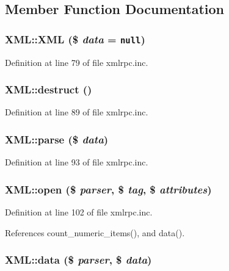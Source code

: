 \subsection{Member Function Documentation}
\hypertarget{classXML_1475a1374023931e2227277f4047c9aa}{
\subsubsection{\setlength{\rightskip}{0pt plus 5cm}XML::XML (\$ {\em data} = {\tt null})}}
\label{classXML_1475a1374023931e2227277f4047c9aa}




Definition at line 79 of file xmlrpc.inc.\hypertarget{classXML_d1524d80c783b2cd22966462411b9b7d}{
\subsubsection{\setlength{\rightskip}{0pt plus 5cm}XML::destruct ()}}
\label{classXML_d1524d80c783b2cd22966462411b9b7d}




Definition at line 89 of file xmlrpc.inc.\hypertarget{classXML_61e6258dc3d5750100e1f0dd08d6334a}{
\subsubsection{\setlength{\rightskip}{0pt plus 5cm}XML::parse (\$ {\em data})}}
\label{classXML_61e6258dc3d5750100e1f0dd08d6334a}




Definition at line 93 of file xmlrpc.inc.\hypertarget{classXML_eac7eae74d866d4f5a0cdb9be27ff279}{
\subsubsection{\setlength{\rightskip}{0pt plus 5cm}XML::open (\$ {\em parser}, \$ {\em tag}, \$ {\em attributes})}}
\label{classXML_eac7eae74d866d4f5a0cdb9be27ff279}




Definition at line 102 of file xmlrpc.inc.

References count\_\-numeric\_\-items(), and data().\hypertarget{classXML_ca70dfbd3e8ce956075181701b09b033}{
\subsubsection{\setlength{\rightskip}{0pt plus 5cm}XML::data (\$ {\em parser}, \$ {\em data})}}
\label{classXML_ca70dfbd3e8ce956075181701b09b033}




